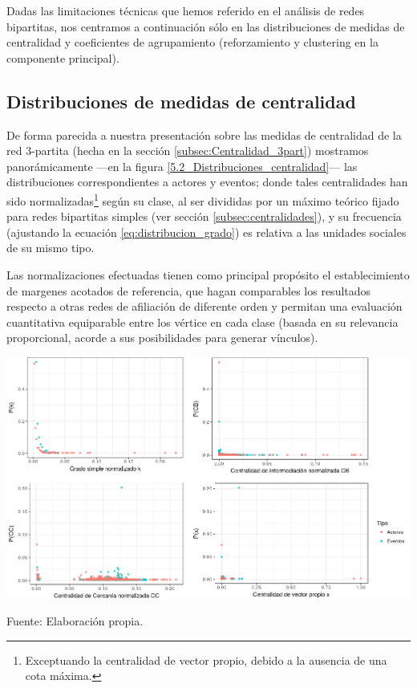 \documentclass[letterpaper, 11pt]{book}
\theoremstyle{definition}
\theoremstyle{remark}
\begin{document}
Dadas las limitaciones técnicas que hemos referido en el análisis de redes bipartitas, nos centramos a continuación sólo en las distribuciones de medidas de centralidad y coeficientes de agrupamiento (reforzamiento y clustering en la componente principal). 




\subsection{Distribuciones de medidas de centralidad}
\label{subsec:Distribucion_medidas_centralidad_bip}

De forma parecida a nuestra presentación sobre las medidas de centralidad de la red 3-partita (hecha en la sección \ref{subsec:Centralidad_3part}) mostramos panorámicamente ---en la figura \ref{5.2_Distribuciones_centralidad}--- las distribuciones correspondientes a actores y eventos; donde tales centralidades han sido normalizadas\footnote{
    Exceptuando la centralidad de vector propio, debido a la ausencia de una cota máxima. 
} 
según su clase, al ser divididas por un máximo teórico fijado para redes bipartitas simples (ver sección \ref{subsec:centralidades}),  y su frecuencia (ajustando la ecuación \ref{eq:distribucion_grado}) es relativa a las unidades sociales de su mismo tipo. 

Las normalizaciones efectuadas tienen como principal propósito el establecimiento de margenes acotados de referencia, que hagan comparables los resultados respecto a otras redes de afiliación de diferente orden y permitan una evaluación cuantitativa equiparable entre los vértice en cada clase (basada en su relevancia proporcional, acorde a sus posibilidades para generar vínculos). 


\hspace{-1.5em}\begin{minipage}{\linewidth}
\centering
{} \label{5.2_Distribuciones_centralidad}
\includegraphics[scale=0.45]{img/5.2_Distribuciones_centralidad.png}
\par\bigskip
\small Fuente: Elaboración propia.
\end{minipage}\bigskip
\end{document}
